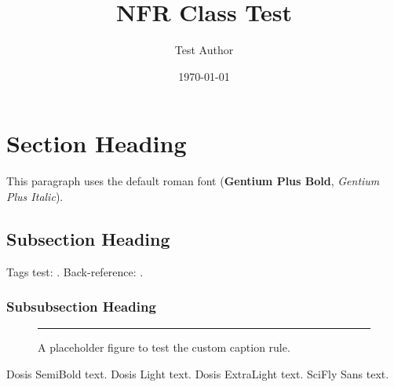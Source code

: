 \documentclass[12pt,a4paper]{nfr}
\title{NFR Class Test}
\author{Test Author}
\date{\today}
\begin{document}
\maketitle

\section{Section Heading}

This paragraph uses the default roman font (\textbf{Gentium Plus Bold}, \textit{Gentium Plus Italic}).

\subsection{Subsection Heading}

Tags test: . Back-reference: .

\subsubsection{Subsubsection Heading}

\begin{figure}[h]
  \centering
  \rule{4cm}{2cm}
  \caption{A placeholder figure to test the custom caption rule.}
\end{figure}

{\DosisSemiBold Dosis SemiBold text.}
{\DosisLight Dosis Light text.}
{\DosisExtraLight Dosis ExtraLight text.}
{\SciFly SciFly Sans text.}
\end{document}
